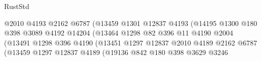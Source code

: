 \begin{lexlean}{RustStd}
\begin{coremodule}
{\begin{coremodule}
{{{{{{{{{{{{{{{{{{{{{{{{{{{{{{{                                                @2010
                                                @4193
                                                @2162
                                                @6787
                                                (@13459
                                                  @1301
                                                  @12837
                                                  @4193
                                                  (@14195
                                                    @1300
                                                    @180
                                                    @398
                                                    @3089
                                                    @4192
                                                    @14204
                                                    (@13464
                                                      @1298
                                                      @82
                                                      @396
                                                      @11
                                                      @4190
                                                      @2004
                                                      (@13491
                                                        @1298
                                                        @396
                                                        @4190
                                                        (@13451
                                                          @1297
                                                          @12837
                                                          @2010
                                                          @4189
                                                          @2162
                                                          @6787
                                                          (@13459
                                                            @1297
                                                            @12837
                                                            @4189
                                                            (@19136
                                                              @842
                                                              @180
                                                              @398
                                                              @3629
                                                              @3246
}}}}}}}}}}}}}}}}}}}}}}}}}}}}}}}
\end{coremodule}}
\end{coremodule}
\end{lexlean}
